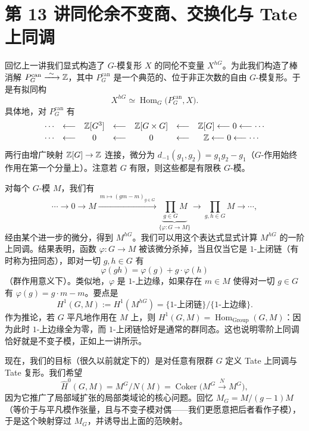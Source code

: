 \section*{第 13 讲\quad 同伦余不变商、交换化与 Tate 上同调}

回忆上一讲我们显式构造了 $G$-模复形 $X$ 的同伦不变量 $X^{hG}$。为此我们构造了棒消解 $P_G^{\mathrm{can}}\xrightarrow{\ \sim\ }\Z$，其中 $P_G^{\mathrm{can}}$ 是一个典范的、位于非正次数的自由 $G$-模复形。于是有拟同构
\[
X^{hG}\simeq\operatorname{Hom}_G\bigl(P_G^{\mathrm{can}},X\bigr).
\]
具体地，对 $P_G^{\mathrm{can}}$ 有
\[
\begin{array}{ccccccc}
\cdots & \longleftarrow & \mathbb{Z}[G^{3}] & \longleftarrow & \mathbb{Z}[G\times G] & \longleftarrow & \mathbb{Z}[G]\longleftarrow 0\longleftarrow\cdots\\[2pt]
\cdots & \longleftarrow & 0 & \longleftarrow & 0 & \longleftarrow & \mathbb{Z}\longleftarrow 0\longleftarrow\cdots
\end{array}
\]
两行由增广映射 $\mathbb{Z}[G]\to\mathbb{Z}$ 连接，微分为 $d_{-1}(g_1,g_2)=g_1g_2-g_1$（$G$-作用始终作用在第一个分量上）。注意若 $G$ 有限，则这些都是有限秩 $G$-模。

对每个 $G$-模 $M$，我们有
\[
\cdots\to 0\to M\xrightarrow{\ m\mapsto(gm-m)_{g\in G}\ }\underbrace{\prod_{g\in G}M}_{\{\varphi\colon G\to M\}}\to\prod_{g,h\in G}M\to\cdots,
\]
经由某个进一步的微分，得到 $M^{hG}$。我们可以用这个表达式显式计算 $M^{hG}$ 的一阶上同调。结果表明，函数 $\varphi\colon G\to M$ 被该微分杀掉，当且仅当它是 $1$-上闭链（有时称为扭同态），即对一切 $g,h\in G$ 有
\[
\varphi(gh)=\varphi(g)+g\cdot\varphi(h)
\]
（群作用意义下）。类似地，$\varphi$ 是 $1$-上边缘，如果存在 $m\in M$ 使得对一切 $g\in G$ 有 $\varphi(g)=g\cdot m-m$。要点是
\[
H^{1}(G,M):=H^{1}(M^{hG})=\{1\text{-上闭链}\}/\{1\text{-上边缘}\}.
\]
作为推论，若 $G$ 平凡地作用在 $M$ 上，则 $H^{1}(G,M)=\operatorname{Hom}_{\mathrm{Group}}(G,M)$：因为此时 $1$-上边缘全为零，而 $1$-上闭链恰好是通常的群同态。这也说明零阶上同调恰好就是不变子模，正如上一讲所示。

现在，我们的目标（很久以前就定下的）是对任意有限群 $G$ 定义 Tate 上同调与 Tate 复形。我们希望
\[
\widehat{H}^{0}(G,M)=M^{G}/N(M)=\operatorname{Coker}\bigl(M^{G}\xrightarrow{\ N\ }M^{G}\bigr),
\]
因为它推广了局部域扩张的局部类域论的核心问题。回忆 $M_{G}=M/(g-1)M$（等价于与平凡模作张量，且与不变子模对偶——我们更愿意把后者看作子模），于是这个映射穿过 $M_{G}$，并诱导出上面的范映射。

